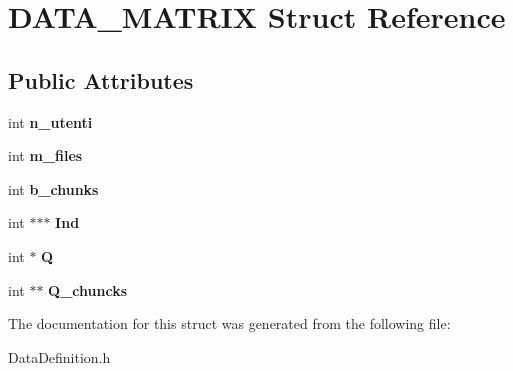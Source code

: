 \hypertarget{structDATA__MATRIX}{\section{D\-A\-T\-A\-\_\-\-M\-A\-T\-R\-I\-X Struct Reference}
\label{structDATA__MATRIX}
}
\subsection*{Public Attributes}
\begin{DoxyCompactItemize}
\item 
\hypertarget{structDATA__MATRIX_aae6daea8805e8718aa68a84bcca6241b}{int {\bfseries n\-\_\-utenti}}\label{structDATA__MATRIX_aae6daea8805e8718aa68a84bcca6241b}

\item 
\hypertarget{structDATA__MATRIX_a4dabab55b019bad68745b2017beca72f}{int {\bfseries m\-\_\-files}}\label{structDATA__MATRIX_a4dabab55b019bad68745b2017beca72f}

\item 
\hypertarget{structDATA__MATRIX_a2d20067a548ed52d36fbc33ea8be6920}{int {\bfseries b\-\_\-chunks}}\label{structDATA__MATRIX_a2d20067a548ed52d36fbc33ea8be6920}

\item 
\hypertarget{structDATA__MATRIX_ab84fa0383965f21e5169de993040734a}{int $\ast$$\ast$$\ast$ {\bfseries Ind}}\label{structDATA__MATRIX_ab84fa0383965f21e5169de993040734a}

\item 
\hypertarget{structDATA__MATRIX_a6cc2252dd6e2e65dd098c0ded22a75a9}{int $\ast$ {\bfseries Q}}\label{structDATA__MATRIX_a6cc2252dd6e2e65dd098c0ded22a75a9}

\item 
\hypertarget{structDATA__MATRIX_afddbea5ee6d0ab5d894b4ac1dc79681c}{int $\ast$$\ast$ {\bfseries Q\-\_\-chuncks}}\label{structDATA__MATRIX_afddbea5ee6d0ab5d894b4ac1dc79681c}

\end{DoxyCompactItemize}


The documentation for this struct was generated from the following file\-:\begin{DoxyCompactItemize}
\item 
Data\-Definition.\-h\end{DoxyCompactItemize}
